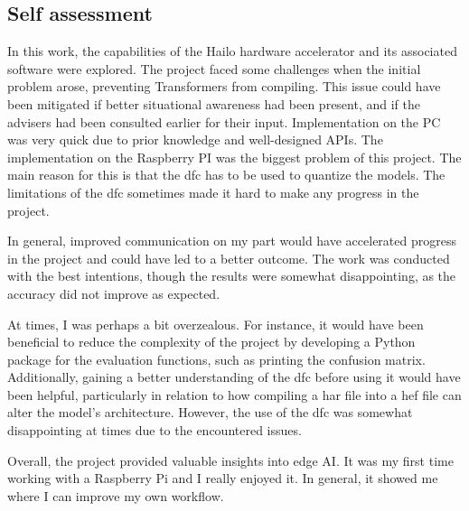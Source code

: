 \subsection*{Self assessment}
In this work, the capabilities of the Hailo hardware accelerator and its associated software were explored.
The project faced some challenges when the initial problem arose, preventing Transformers from compiling.
This issue could have been mitigated if better situational awareness had been present, and if the advisers had been consulted earlier for their input.
Implementation on the PC was very quick due to prior knowledge and well-designed APIs.
The implementation on the Raspberry PI was the biggest problem of this project.
The main reason for this is that the \acrshort{dfc} has to be used to quantize the models.
The limitations of the \acrshort{dfc} sometimes made it hard to make any progress in the project.

In general, improved communication on my part would have accelerated progress in the project and could have led to a better outcome.
The work was conducted with the best intentions, though the results were somewhat disappointing, as the accuracy did not improve as expected.

At times, I was perhaps a bit overzealous.
For instance, it would have been beneficial to reduce the complexity of the project by developing a Python package for the evaluation functions, such as printing the confusion matrix.
Additionally, gaining a better understanding of the \acrshort{dfc} before using it would have been helpful, particularly in relation to how compiling a \acrshort{har} file into a \acrshort{hef} file can alter the model's architecture.
However, the use of the \acrshort{dfc} was somewhat disappointing at times due to the encountered issues.

Overall, the project provided valuable insights into edge AI.
It was my first time working with a Raspberry Pi and I really enjoyed it.
In general, it showed me where I can improve my own workflow.

